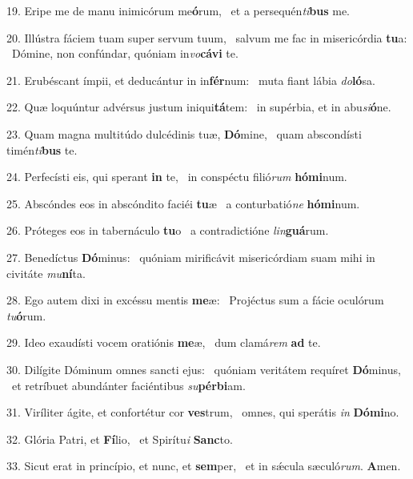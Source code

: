 19. Eripe me de manu inimicórum me\textbf{ó}rum, \ast\  et a persequén\textit{ti}\textbf{bus} me.\

20. Illústra fáciem tuam super servum tuum, \dag\  salvum me fac in misericórdia \textbf{tu}a: \ast\  Dómine, non confúndar, quóniam in\textit{vo}\textbf{cá}\textbf{vi} te.\

21. Erubéscant ímpii, et deducántur in in\textbf{fér}num: \ast\  muta fiant lábia \textit{do}\textbf{ló}sa.\

22. Quæ loquúntur advérsus justum iniqui\textbf{tá}tem: \ast\  in supérbia, et in abu\textit{si}\textbf{ó}ne.\

23. Quam magna multitúdo dulcédinis tuæ, \textbf{Dó}mine, \ast\  quam abscondísti timén\textit{ti}\textbf{bus} te.\

24. Perfecísti eis, qui sperant \textbf{in} te, \ast\  in conspéctu filió\textit{rum} \textbf{hó}\textbf{mi}num.\

25. Abscóndes eos in abscóndito faciéi \textbf{tu}æ \ast\  a conturbatió\textit{ne} \textbf{hó}\textbf{mi}num.\

26. Próteges eos in tabernáculo \textbf{tu}o \ast\  a contradictióne \textit{lin}\textbf{guá}rum.\

27. Benedíctus \textbf{Dó}minus: \ast\  quóniam mirificávit misericórdiam suam mihi in civitáte \textit{mu}\textbf{ní}ta.\

28. Ego autem dixi in excéssu mentis \textbf{me}æ: \ast\  Projéctus sum a fácie oculórum \textit{tu}\textbf{ó}rum.\

29. Ideo exaudísti vocem oratiónis \textbf{me}æ, \ast\  dum clamá\textit{rem} \textbf{ad} te.\

30. Dilígite Dóminum omnes sancti ejus: \dag\  quóniam veritátem requíret \textbf{Dó}minus, \ast\  et retríbuet abundánter faciéntibus \textit{su}\textbf{pér}\textbf{bi}am.\

31. Viríliter ágite, et confortétur cor \textbf{ves}trum, \ast\  omnes, qui sperátis \textit{in} \textbf{Dó}\textbf{mi}no.\

32. Glória Patri, et \textbf{Fí}lio, \ast\  et Spirítu\textit{i} \textbf{Sanc}to.\

33. Sicut erat in princípio, et nunc, et \textbf{sem}per, \ast\  et in sǽcula sæculó\textit{rum}. \textbf{A}men.\

